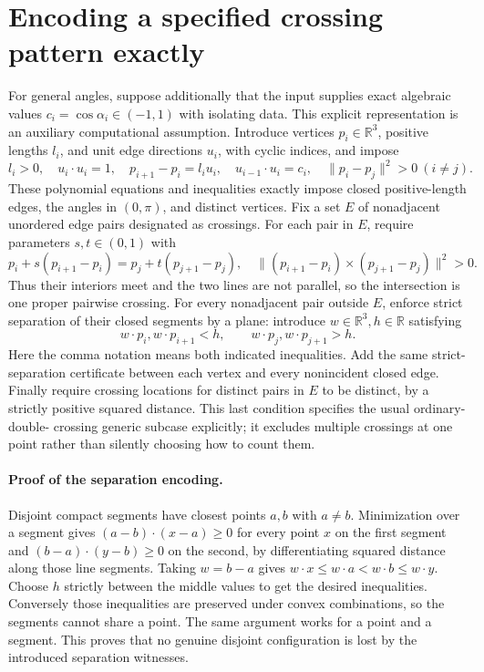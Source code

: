 \documentclass[11pt]{article}
\begin{document}
\section{Encoding a specified crossing pattern exactly}
For general angles, suppose additionally that the input supplies exact
algebraic values $c_i=\cos\alpha_i\in(-1,1)$ with isolating data.
This explicit representation is an auxiliary computational assumption.
Introduce vertices $p_i\in\mathbb R^3$, positive lengths $l_i$, and
unit edge directions $u_i$, with cyclic indices, and impose
\[
l_i>0,\quad u_i\cdot u_i=1,\quad
p_{i+1}-p_i=l_i u_i,\quad u_{i-1}\cdot u_i=c_i,
\quad \|p_i-p_j\|^2>0\ (i\ne j).
\]
These polynomial equations and inequalities exactly impose closed
positive-length edges, the angles in $(0,\pi)$, and distinct vertices.
Fix a set $E$ of nonadjacent unordered edge pairs designated as crossings.
For each pair in $E$, require parameters $s,t\in(0,1)$ with
\[
p_i+s(p_{i+1}-p_i)=p_j+t(p_{j+1}-p_j),
\quad\|(p_{i+1}-p_i)\mathbin{\times}(p_{j+1}-p_j)\|^2>0.
\]
Thus their interiors meet and the two lines are not parallel, so the
intersection is one proper pairwise crossing. For every nonadjacent
pair outside $E$, enforce strict separation of their closed segments
by a plane: introduce $w\in\mathbb R^3,h\in\mathbb R$ satisfying
\[
w\cdot p_i,w\cdot p_{i+1}<h,
\qquad w\cdot p_j,w\cdot p_{j+1}>h.
\]
Here the comma notation means both indicated inequalities. Add the
same strict-separation certificate between each vertex and every
nonincident closed edge. Finally require crossing locations for
distinct pairs in $E$ to be distinct, by a strictly positive squared
distance. This last condition specifies the usual ordinary-double-
crossing generic subcase explicitly; it excludes multiple crossings
at one point rather than silently choosing how to count them.

\paragraph{Proof of the separation encoding.}
Disjoint compact segments have closest points $a,b$ with $a\ne b$.
Minimization over a segment gives
$(a-b)\cdot(x-a)\ge0$ for every point $x$ on the first segment
and $(b-a)\cdot(y-b)\ge0$ on the second, by differentiating squared
distance along those line segments. Taking $w=b-a$ gives
$w\cdot x\le w\cdot a<w\cdot b\le w\cdot y$.
Choose $h$ strictly between the middle values to get the desired
inequalities. Conversely those inequalities are preserved under convex
combinations, so the segments cannot share a point. The same argument
works for a point and a segment. This proves that no genuine disjoint
configuration is lost by the introduced separation witnesses.
\end{document}
